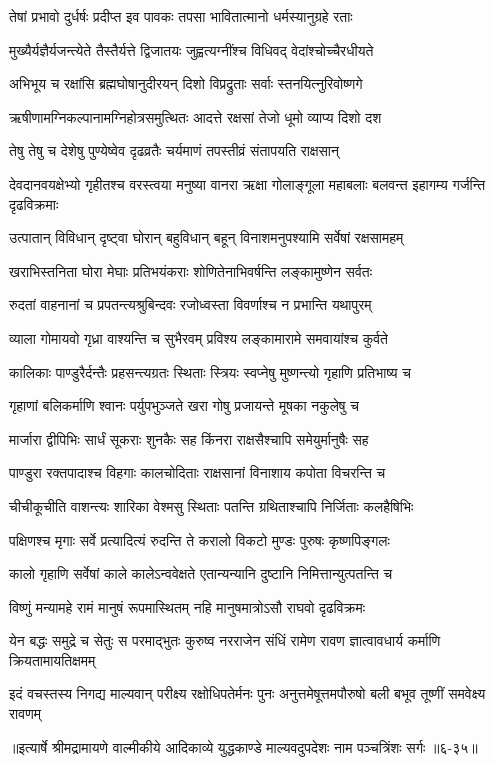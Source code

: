 \twolineshloka
{तेषां प्रभावो दुर्धर्षः प्रदीप्त इव पावकः}
{तपसा भावितात्मानो धर्मस्यानुग्रहे रताः} %

\twolineshloka
{मुख्यैर्यज्ञैर्यजन्त्येते तैस्तैर्यत्ते द्विजातयः}
{जुह्वत्यग्नींश्च विधिवद् वेदांश्चोच्चैरधीयते} %

\twolineshloka
{अभिभूय च रक्षांसि ब्रह्मघोषानुदीरयन्}
{दिशो विप्रद्रुताः सर्वाः स्तनयित्नुरिवोष्णगे} %

\twolineshloka
{ऋषीणामग्निकल्पानामग्निहोत्रसमुत्थितः}
{आदत्ते रक्षसां तेजो धूमो व्याप्य दिशो दश} %

\twolineshloka
{तेषु तेषु च देशेषु पुण्येष्वेव दृढव्रतैः}
{चर्यमाणं तपस्तीव्रं संतापयति राक्षसान्} %

\threelineshloka
{देवदानवयक्षेभ्यो गृहीतश्च वरस्त्वया}
{मनुष्या वानरा ऋक्षा गोलाङ्गूला महाबलाः}
{बलवन्त इहागम्य गर्जन्ति दृढविक्रमाः} %

\twolineshloka
{उत्पातान् विविधान् दृष्ट्वा घोरान् बहुविधान् बहून्}
{विनाशमनुपश्यामि सर्वेषां रक्षसामहम्} %

\twolineshloka
{खराभिस्तनिता घोरा मेघाः प्रतिभयंकराः}
{शोणितेनाभिवर्षन्ति लङ्कामुष्णेन सर्वतः} %

\twolineshloka
{रुदतां वाहनानां च प्रपतन्त्यश्रुबिन्दवः}
{रजोध्वस्ता विवर्णाश्च न प्रभान्ति यथापुरम्} %

\twolineshloka
{व्याला गोमायवो गृध्रा वाश्यन्ति च सुभैरवम्}
{प्रविश्य लङ्कामारामे समवायांश्च कुर्वते} %

\twolineshloka
{कालिकाः पाण्डुरैर्दन्तैः प्रहसन्त्यग्रतः स्थिताः}
{स्त्रियः स्वप्नेषु मुष्णन्त्यो गृहाणि प्रतिभाष्य च} %

\twolineshloka
{गृहाणां बलिकर्माणि श्वानः पर्युपभुञ्जते}
{खरा गोषु प्रजायन्ते मूषका नकुलेषु च} %

\twolineshloka
{मार्जारा द्वीपिभिः सार्धं सूकराः शुनकैः सह}
{किंनरा राक्षसैश्चापि समेयुर्मानुषैः सह} %

\twolineshloka
{पाण्डुरा रक्तपादाश्च विहगाः कालचोदिताः}
{राक्षसानां विनाशाय कपोता विचरन्ति च} %

\twolineshloka
{चीचीकूचीति वाशन्त्यः शारिका वेश्मसु स्थिताः}
{पतन्ति ग्रथिताश्चापि निर्जिताः कलहैषिभिः} %

\twolineshloka
{पक्षिणश्च मृगाः सर्वे प्रत्यादित्यं रुदन्ति ते}
{करालो विकटो मुण्डः पुरुषः कृष्णपिङ्गलः} %

\twolineshloka
{कालो गृहाणि सर्वेषां काले कालेऽन्ववेक्षते}
{एतान्यन्यानि दुष्टानि निमित्तान्युत्पतन्ति च} %

\twolineshloka
{विष्णुं मन्यामहे रामं मानुषं रूपमास्थितम्}
{नहि मानुषमात्रोऽसौ राघवो दृढविक्रमः} %

\threelineshloka
{येन बद्धः समुद्रे च सेतुः स परमाद्भुतः}
{कुरुष्व नरराजेन संधिं रामेण रावण}
{ज्ञात्वावधार्य कर्माणि क्रियतामायतिक्षमम्} %

\twolineshloka
{इदं वचस्तस्य निगद्य माल्यवान् परीक्ष्य रक्षोधिपतेर्मनः पुनः}
{अनुत्तमेषूत्तमपौरुषो बली बभूव तूष्णीं समवेक्ष्य रावणम्} %


॥इत्यार्षे श्रीमद्रामायणे वाल्मीकीये आदिकाव्ये युद्धकाण्डे माल्यवदुपदेशः नाम पञ्चत्रिंशः सर्गः ॥६-३५॥
